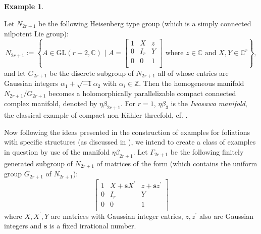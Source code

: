 \documentclass[12pt]{amsart}
\numberwithin{equation}{section}
\theoremstyle{definition}
\newtheorem{example}  [theorem]     {Example}
\theoremstyle{definition}
\theoremstyle{definition}
\renewcommand{\1}{\mathsf{1}}
\renewcommand{\>}{\rightarrow}
\def\mb{\mathbb}
\theoremstyle{plain} %
\theoremstyle{plain} %
\theoremstyle{plain} %
\begin{document}
	\begin{example}\label{nilmanifold}
		
		Let $N_{2r+1}$ be the following Heisenberg type group (which is a simply connected nilpotent  Lie group):
		\begin{equation*}
			N_{2r+1}:=\left\{A\in \text{GL}(r+2,\mb C)\,\, |\,\,A=\begin{bmatrix}
				1 &  X & z \\
				0 & I_r & Y \\
				0  & 0& 1 \\
			\end{bmatrix} \text{ where } z\in\mb C\text { and } {X,Y\in \mb C^r}\right\},
		\end{equation*}
		and let $G_{2r+1}$ be the discrete subgroup of $N_{2r+1}$ all of whose entries are Gaussian integers $\alpha_1+\sqrt{-1}\alpha_2$ with $\alpha_i\in \mb Z$. Then the homogeneous manifold $N_{2r+1}/G_{2r+1}$ becomes  a holomorphically parallelizable compact connected complex manifold, denoted by $\eta\beta_{2r+1}$. For $r=1$, $\eta\beta_3$ is the \textit{Iwasawa manifold}, the classical example of compact non-K\"ahler threefold, cf. \cite[p. 205]{AB91}.
		
		Now following the ideas presented in the construction of examples for foliations with specific structures (as discussed in \cite[Section 2]{CW90}), we intend to create a class of examples in question by use of  the manifold $\eta\beta_{2r+1}$. Let $\Gamma_{2r+1}$ be the following finitely generated subgroup of $N_{2r+1}$ of matrices of the form (which contains the uniform group $G_{2r+1}$ of $N_{2r+1}$):
		\begin{equation*}
			\begin{bmatrix}
				1 &  X+\boldsymbol{s}X^\prime & z+\boldsymbol{s} z^\prime \\
				0 & I_r & Y \\
				0  & 0& 1 \\
			\end{bmatrix}
		\end{equation*}
		where $X, X^\prime,Y$ are matrices with Gaussian integer entries, $z,z^\prime$ also are Gaussian integers and $\boldsymbol{s}$  is a fixed irrational number.
		

\end{example}
\end{document}
